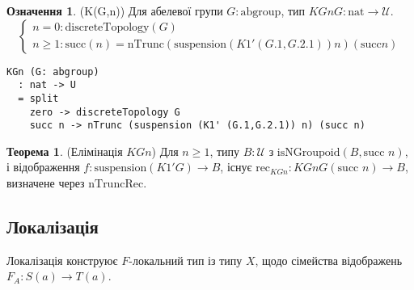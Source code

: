 \documentclass{article}
\theoremstyle{definition}
\newtheorem{theorem}{Теорема}
\newtheorem{definition}{Означення}
\begin{document}
\begin{definition} (K(G,n))
Для абелевої групи \( G : \text{abgroup} \), тип \( KGn G : \text{nat} \to \mathcal{U} \).
\[
\begin{cases}
n = 0: \text{discreteTopology}(G) \\
n \geq 1: \text{succ}(n) = \text{nTrunc}(\text{suspension}(K1' (G.1, G.2.1)) n) (\text{succ} n)
\end{cases}
\]
\begin{lstlisting}
KGn (G: abgroup)
  : nat -> U
  = split
    zero -> discreteTopology G
    succ n -> nTrunc (suspension (K1' (G.1,G.2.1)) n) (succ n)
\end{lstlisting}
\end{definition}

\begin{theorem} (Елімінація \( KGn \))
Для \( n \geq 1 \), типу \( B : \mathcal{U} \) з \( \text{isNGroupoid}(B, \text{succ } n) \),
і відображення \( f : \text{suspension}(K1' G) \to B \), існує
\( \text{rec}_{KGn} : KGn G (\text{succ } n) \to B \),
визначене через \( \text{nTruncRec} \).
\end{theorem}

\newpage
\subsection{Локалізація}
Локалізація конструює \( F \)-локальний тип із типу \( X \),
щодо сімейства відображень \( F_A : S(a) \to T(a) \).
\end{document}
